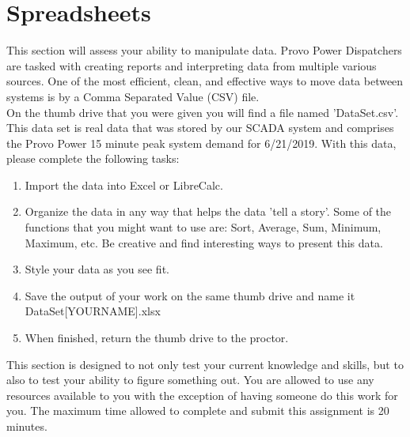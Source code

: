 \documentclass[12pt,letterpaper]{article}
\begin{document}
\section*{Spreadsheets}
This section will assess your ability to manipulate data. Provo Power Dispatchers are tasked with creating reports and interpreting data from multiple various sources. One of the most efficient, clean, and effective ways to move data between systems is by a Comma Separated Value (CSV) file.\\
On the thumb drive that you were given you will find a file named 'DataSet.csv'. This data set is real data that was stored by our SCADA system and comprises the Provo Power 15 minute peak system demand for 6/21/2019. With this data, please complete the following tasks:
\begin{enumerate}
    \item Import the data into Excel or LibreCalc.
    \item Organize the data in any way that helps the data 'tell a story'. Some of the functions that you might want to use are: Sort, Average, Sum, Minimum, Maximum, etc. Be creative and find interesting ways to present this data.
    \item Style your data as you see fit.
    \item Save the output of your work on the same thumb drive and name it DataSet[YOURNAME].xlsx
    \item When finished, return the thumb drive to the proctor. 
\end{enumerate}
This section is designed to not only test your current knowledge and skills, but to also to test your ability to figure something out. You are allowed to use any resources available to you with the exception of having someone do this work for you. The maximum time allowed to complete and submit this assignment is 20 minutes.
\end{document}
